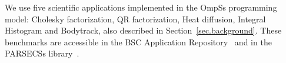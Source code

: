 We use five scientific applications implemented in the OmpSs programming model: Cholesky factorization, QR factorization, Heat diffusion, Integral Histogram and Bodytrack, also described in Section~\ref{sec.background}. 
These benchmarks are accessible in the BSC Application Repository~\cite{BAR} and in the PARSECSs library~\cite{Chasapis:TACO2016}. 



